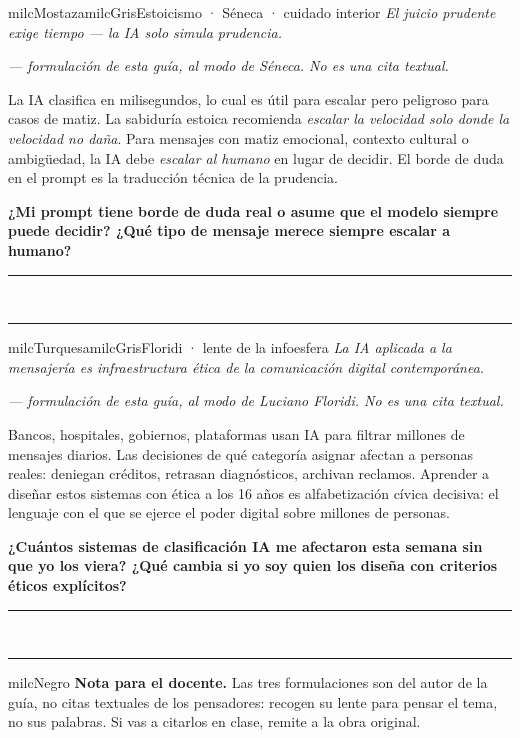 \documentclass[11pt,letterpaper]{article}
\newcommand{\linead}[1]{\noindent\color{milcLinea}\rule{#1}{0.5pt}\color{milcNegro}}
\begin{document}
\begin{softbox}{milcMostaza}{milcGris}{Estoicismo · Séneca · cuidado interior}
\textit{El juicio prudente exige tiempo --- la IA solo simula prudencia.}

{\footnotesize\itshape\color{milcNegro!70}--- formulación de esta guía, al modo de Séneca. No es una cita textual.}

La IA clasifica en milisegundos, lo cual es útil para escalar pero peligroso para casos de matiz. La sabiduría estoica recomienda \emph{escalar la velocidad solo donde la velocidad no daña}. Para mensajes con matiz emocional, contexto cultural o ambigüedad, la IA debe \emph{escalar al humano} en lugar de decidir. El borde de duda en el prompt es la traducción técnica de la prudencia.

\textbf{¿Mi prompt tiene borde de duda real o asume que el modelo siempre puede decidir? ¿Qué tipo de mensaje merece siempre escalar a humano?}
\end{softbox}
\linead{\linewidth}\\[1mm]
\linead{\linewidth}

\begin{softbox}{milcTurquesa}{milcGris}{Floridi · lente de la infoesfera}
\textit{La IA aplicada a la mensajería es infraestructura ética de la comunicación digital contemporánea.}

{\footnotesize\itshape\color{milcNegro!70}--- formulación de esta guía, al modo de Luciano Floridi. No es una cita textual.}

Bancos, hospitales, gobiernos, plataformas usan IA para filtrar millones de mensajes diarios. Las decisiones de qué categoría asignar afectan a personas reales: deniegan créditos, retrasan diagnósticos, archivan reclamos. Aprender a diseñar estos sistemas con ética a los 16 años es alfabetización cívica decisiva: el lenguaje con el que se ejerce el poder digital sobre millones de personas.

\textbf{¿Cuántos sistemas de clasificación IA me afectaron esta semana sin que yo los viera? ¿Qué cambia si yo soy quien los diseña con criterios éticos explícitos?}
\end{softbox}
\linead{\linewidth}\\[1mm]
\linead{\linewidth}

\begin{infoband}{milcNegro}
\textbf{Nota para el docente.} Las tres formulaciones son del autor de la guía, no citas textuales de los pensadores: recogen su lente para pensar el tema, no sus palabras. Si vas a citarlos en clase, remite a la obra original.
\end{infoband}
\end{document}
